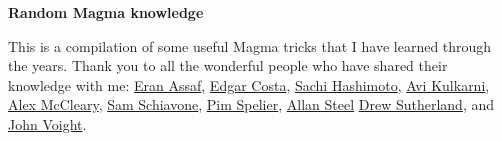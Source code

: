\documentclass[12pt]{article}
\begin{document}
\begin{center}
\begin{Large}
    \textbf{Random \textsf{Magma} knowledge}\\
\end{Large}
\end{center}

This is a compilation of some useful \textsf{Magma} tricks that I have learned through the years. Thank you to all the wonderful people who have shared their knowledge with me:
\href{https://math.dartmouth.edu/~eassaf/}{Eran Assaf},
\href{https://math.mit.edu/~edgarc/}{Edgar Costa},
\href{https://sachihashimoto.github.io}{Sachi Hashimoto},
\href{https://math.dartmouth.edu/~akulkarn/}{Avi Kulkarni},
\href{https://www.alexmccleary.org}{Alex McCleary},
\href{https://math.mit.edu/~sschiavo/}{Sam Schiavone},
\href{https://sites.google.com/view/pim-spelier/home}{Pim Spelier},
\href{https://magma.maths.usyd.edu.au/users/allan/}{Allan Steel}
\href{https://math.mit.edu/~drew/}{Drew Sutherland}, and
\href{https://jvoight.github.io}{John Voight}.
\end{document}

